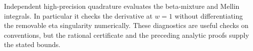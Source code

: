 Independent high-precision quadrature evaluates the beta-mixture and
Mellin integrals. In particular it checks the derivative at $w=1$
without differentiating the removable eta singularity numerically.
These diagnostics are useful checks on conventions, but the rational
certificate and the preceding analytic proofs supply the stated bounds.
